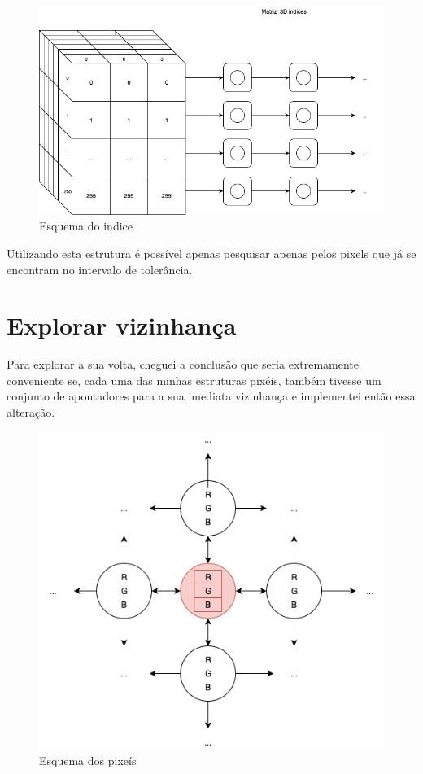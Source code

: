 \documentclass{article}
\begin{document}
\begin{figure}[htbp]
\centerline{\includegraphics[scale=0.5]{Diagram1.png}}
\caption{Esquema do indice}
\label{fig2}
\end{figure}

Utilizando esta estrutura é possível apenas pesquisar apenas pelos pixels que já se encontram no intervalo de tolerância.  

\section{Explorar vizinhança}

Para explorar a sua volta, cheguei a conclusão que seria extremamente conveniente se, cada uma das minhas estruturas pixéis, também tivesse um conjunto de apontadores para a sua imediata vizinhança e implementei então essa alteração.

\begin{figure}[htbp]
\centerline{\includegraphics[scale=0.5]{Diagram2.png}}
\caption{Esquema dos pixeís}
\label{fig2}
\end{figure}
 
\end{document}
